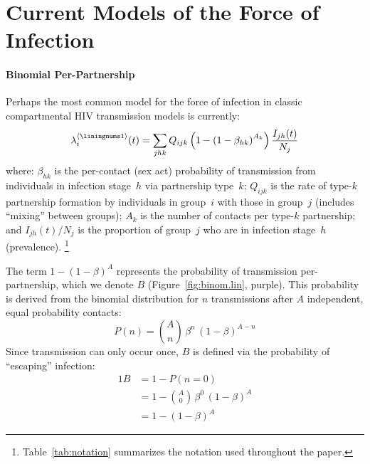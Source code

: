 \section{Current Models of the Force of Infection}\label{prior}
\paragraph{ Binomial Per-Partnership}
Perhaps the most common model for the force of infection
in classic compartmental HIV transmission models is currently:
\begin{equation}\label{eq:foi.1}
  \lambda_i^{\case{1}}(t) =
  \sum_{jhk} Q_{ijk} \left(1 - {\left(1 - \beta_{hk}\right)}^{A_k}\right) \frac{I_{jh}(t)}{N_j}
\end{equation}
where:
$\beta_{hk}$ is the per-contact (sex act) probability of transmission
from individuals in infection stage~$h$ via partnership type~$k$;
$Q_{ijk}$ is the rate of type-$k$ partnership formation
by individuals in group~$i$ with those in group~$j$
(includes ``mixing'' between groups);
$A_k$ is the number of contacts per type-$k$ partnership; and
$I_{jh}(t) / N_j$ is the proportion of group~$j$ who are in infection stage~$h$ (prevalence).%
\footnote{Table~\ref{tab:notation} summarizes the notation used throughout the paper.}
\par
The term $1 - (1 - \beta)^A$ represents
the probability of transmission per-partnership, which we denote $B$
(Figure~\ref{fig:binom.lin}, purple).
This probability is derived from the binomial distribution
for $n$ transmissions after $A$ independent, equal probability contacts:
\begin{equation}
  P(n) = {A \choose n}\,\beta^n\,{(1 - \beta)}^{A-n}
\end{equation}
Since transmission can only occur once, $B$ is defined via the probability of ``escaping'' infection:
\begin{alignat}{1}\label{eq:B}
  B &= 1 - P(n = 0) \nonumber\\
  &= 1 - {A \choose 0}\,\beta^0\,{(1 - \beta)}^{A} \nonumber\\
  &= 1 - {(1 - \beta)}^A
\end{alignat}
